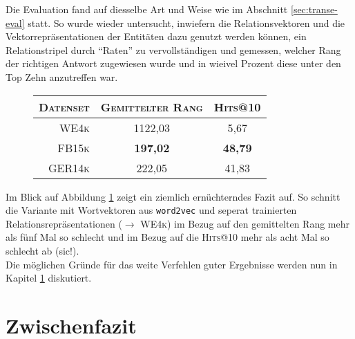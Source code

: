 Die Evaluation fand auf diesselbe Art und Weise wie im Abschnitt \ref{sec:transe-eval} statt. So wurde wieder untersucht,
inwiefern die Relationsvektoren und die Vektorrepräsentationen der Entitäten dazu genutzt werden können, ein Relationstripel
durch ``Raten'' zu vervollständigen und gemessen, welcher Rang der richtigen Antwort zugewiesen wurde und in wieivel Prozent
diese unter den Top Zehn anzutreffen war.

\begin{figure}[h]
  \centering
  \begin{tabular}{r||c|c}
    \textsc{Datenset} & \textsc{Gemittelter Rang} & \textsc{Hits@10} \\
     \hline
     \textsc{WE4k} & 1122,03 & 5,67 \\
     \textsc{FB15k} & \textbf{197,02} & \textbf{48,79} \\
     \textsc{GER14k} & 222,05 & 41,83 \\
  \end{tabular}
  \caption[Resultate auf mit Wordvektoren auf \textsc{WE3k}]{\label{fig:eval-we4k}}
\end{figure}

Im Blick auf Abbildung \ref{fig:eval-we4k} zeigt ein ziemlich ernüchterndes Fazit auf. So schnitt die Variante
mit Wortvektoren aus \verb|word2vec| und seperat trainierten Relationsrepräsentationen ($\rightarrow$ \textsc{WE4k}) im Bezug auf
den gemittelten Rang mehr als fünf Mal so schlecht und im Bezug auf die \textsc{Hits@10} mehr als acht Mal so schlecht ab (sic!).\\
Die möglichen Gründe für das weite Verfehlen guter Ergebnisse werden nun in Kapitel \ref{sec:we4k-zwifa} diskutiert.

\section{Zwischenfazit}\label{sec:we4k-zwifa}

